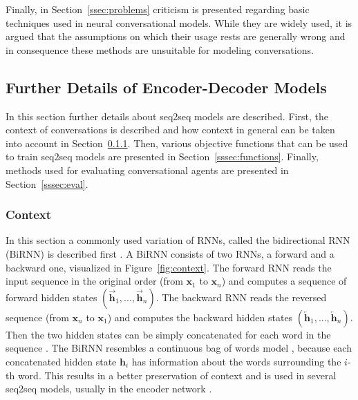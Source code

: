 \documentclass[12pt]{article}
\begin{document}
Finally, in Section~\ref{ssec:problems} criticism is presented regarding basic techniques used in neural conversational models. While they are widely used, it is argued that the assumptions on which their usage rests are generally wrong and in consequence these methods are unsuitable for modeling conversations.

\subsection{Further Details of Encoder-Decoder Models} \label{ssec:31}
In this section further details about seq2seq models are described. First, the context of conversations is described and how context in general can be taken into account in Section~\ref{sssec:context}. Then, various objective functions that can be used to train seq2seq models are presented in Section~\ref{sssec:functions}. Finally, methods used for evaluating conversational agents are presented in Section~\ref{sssec:eval}.

\subsubsection{Context} \label{sssec:context}
In this section a commonly used variation of RNNs, called the bidirectional RNN (BiRNN) is described first \cite{Schuster:1997}. A BiRNN consists of two RNNs, a forward and a backward one, visualized in Figure~\ref{fig:context}. The forward RNN reads the input sequence in the original order (from \(\bm{x}_1\) to \(\bm{x}_n\)) and computes a sequence of forward hidden states \((\overrightarrow{\bm{h}}_1,...,\overrightarrow{\bm{h}}_n)\). The backward RNN reads the reversed sequence (from \(\bm{x}_n\) to \(\bm{x}_1\)) and computes the backward hidden states \((\overleftarrow{\bm{h}}_1,...,\overleftarrow{\bm{h}}_n)\). Then the two hidden states can be simply concatenated for each word in the sequence \cite{Bahdanau:2014,Zhaob:2017}. The BiRNN resembles a continuous bag of words model \cite{Mikolov:2013}, because each concatenated hidden state \(\bm{h}_i\) has information about the words surrounding the \(i\)-th word. This results in a better preservation of context and is used in several seq2seq models, usually in the encoder network \cite{Zhaob:2017,Xing_topic:2017,googleNMT:2016,Yin:2017}.
\end{document}
